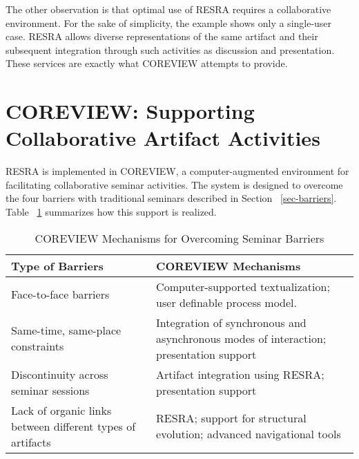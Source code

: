 The other observation is that optimal use of RESRA requires a collaborative
environment. For the sake of simplicity, the example shows only a
single-user case. RESRA allows diverse representations of the same artifact
and their subsequent integration through such activities as discussion and
presentation. These services are exactly what COREVIEW attempts to provide.


\section {COREVIEW: Supporting Collaborative Artifact Activities}

RESRA is implemented in COREVIEW, a computer-augmented environment for
facilitating collaborative seminar activities. The system is designed to
overcome the four barriers with traditional seminars described in Section
~\ref{sec-barriers}. Table ~\ref{tab-cv} summarizes how this support is
realized.

\begin{table}[ht]
  \begin{center}
    \begin{tabular} {|p{2.5in}|p{3.5in}|} \hline   
      {\bf Type of Barriers} & {\bf COREVIEW  Mechanisms} \\ \hline 
       
      Face-to-face barriers & Computer-supported textualization; user
      definable process model. \\ \hline
       
      Same-time, same-place constraints & Integration of synchronous
      and asynchronous modes of interaction; presentation support\\
      \hline
      
      Discontinuity across seminar sessions & Artifact integration
      using RESRA; presentation support \\ \hline
      
      Lack of organic links between different types of artifacts &
      RESRA; support for structural evolution; advanced navigational
      tools \\ \hline
    \end{tabular}
    \caption{COREVIEW Mechanisms for Overcoming Seminar Barriers}
    \label{tab-cv}
  \end{center}
\end{table}

